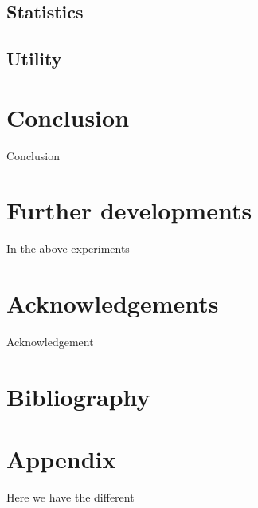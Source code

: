 \documentclass[a4paper,11pt]{article}
\begin{document}
		\subsection{Statistics}
			\label{subsec:statistics}
		\subsection{Utility}
			\label{subsec:utility}

	\clearpage
	\section{Conclusion}
		\label{sec:conclusion}
	 	Conclusion
		 	
		 
	\clearpage
	\section{Further developments}
		\label{sec:furtherdevelopment}
		In the above experiments 
			
		 	
		 	
	\clearpage
	\section{Acknowledgements}
	 
	  	Acknowledgement
		 
 	\clearpage
 	\section{Bibliography}
		
		


	\clearpage
	\section{Appendix}
	 	Here we have the different
\end{document}
